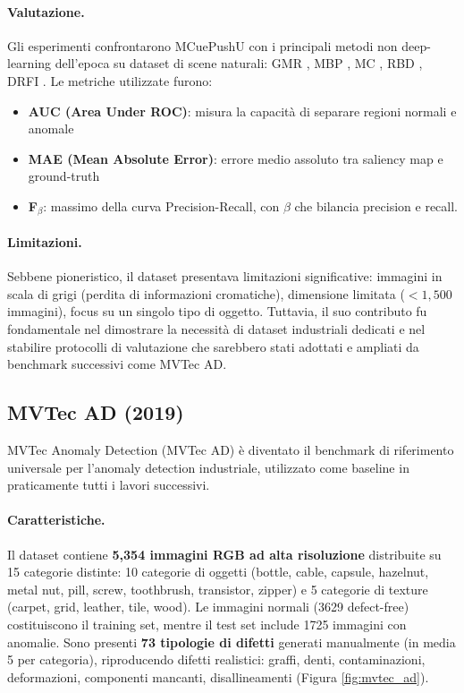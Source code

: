 \paragraph{Valutazione.} Gli esperimenti confrontarono MCuePushU con i principali me\-to\-di non deep-learning dell'epoca su dataset di scene naturali: GMR \cite{yang2013saliency}, MBP \cite{zhang2013minimum}, MC \cite{jiang2013automatic}, RBD \cite{zhu2014saliency}, DRFI \cite{jiang2013salient}. Le metriche utilizzate furono:
\begin{itemize}
\item \textbf{AUC (Area Under ROC)}: misura la capacità di separare regioni normali e anomale
\item \textbf{MAE (Mean Absolute Error)}: errore medio assoluto tra saliency map e ground-truth
\item \textbf{F$_\beta$}: massimo della curva Precision-Recall, con $\beta$ che bilancia precision e recall.
\end{itemize}

\paragraph{Limitazioni.} Sebbene pioneristico, il dataset presentava limitazioni significative: immagini in scala di grigi (perdita di informazioni cromatiche), dimensione limitata ($<1,500$ immagini), focus su un singolo tipo di oggetto. Tuttavia, il suo contributo fu fondamentale nel dimostrare la necessità di dataset industriali dedicati e nel stabilire protocolli di valutazione che sarebbero stati adottati e ampliati da benchmark successivi come MVTec AD.

\subsection{MVTec AD (2019)}
\label{sec:mvtec_ad}
MVTec Anomaly Detection (MVTec AD) \cite{bergmann2019mvtec} è diventato il benchmark di riferimento universale per l'anomaly detection industriale, utilizzato come baseline in praticamente tutti i lavori successivi.

\paragraph{Caratteristiche.} Il dataset contiene \textbf{5,354 immagini RGB ad alta ri\-so\-lu\-zio\-ne} distribuite su 15 categorie distinte: 10 categorie di oggetti (bottle, cable, capsule, hazelnut, metal nut, pill, screw, toothbrush, transistor, zipper) e 5 categorie di texture (carpet, grid, leather, tile, wood). Le immagini normali (3629 defect-free) costituiscono il training set, mentre il test set include 1725 immagini con anomalie. Sono presenti \textbf{73 tipologie di difetti} generati manualmente (in media 5 per categoria), riproducendo difetti realistici: graffi, denti, contaminazioni, deformazioni, componenti mancanti, disallineamenti (Figura \ref{fig:mvtec_ad}).

